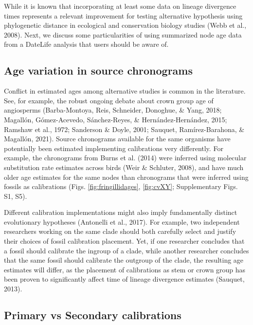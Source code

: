 \documentclass[english,man]{apa6}
\begin{document}
While it is known that incorporating at least some data on lineage divergence times represents a relevant improvement for testing alternative hypothesis using phylogenetic distance in ecological and conservation biology studies (Webb et al., 2008). Next, we discuss some particularities of using summarized node age data from a DateLife analysis that users should be aware of.

\hypertarget{age-variation-in-source-chronograms}{%
\subsection{Age variation in source chronograms}\label{age-variation-in-source-chronograms}}

Conflict in estimated ages among alternative studies is common in the literature. See, for example, the robust ongoing debate about crown group age of angiosperms (Barba-Montoya, Reis, Schneider, Donoghue, \& Yang, 2018; Magallón, Gómez-Acevedo, Sánchez-Reyes, \& Hernández-Hernández, 2015; Ramshaw et al., 1972; Sanderson \& Doyle, 2001; Sauquet, Ramírez-Barahona, \& Magallón, 2021).
Source chronograms available for the same organisms have potentially been estimated implementing calibrations very differently.
For example, the chronograms from Burns et al. (2014) were inferred using molecular substitution rate estimates across birds (Weir \& Schluter, 2008), and have much older age estimates for the same nodes than chronograms that were inferred using fossils as calibrations (Figs. \ref{fig:fringillidages}, \ref{fig:cvXY}; Supplementary Figs. S1, S5).

Different calibration implementations might also imply fundamentally distinct evolutionary hypotheses (Antonelli et al., 2017).
For example, two independent researchers working on the same clade should both carefully select and justify their choices of fossil calibration placement.
Yet, if one researcher concludes that a fossil should calibrate the ingroup of a clade, while another researcher concludes that the same fossil should calibrate the outgroup of the clade, the resulting age estimates will differ, as the placement of calibrations as stem or crown group has been proven to significantly affect time of lineage divergence estimates (Sauquet, 2013).

\hypertarget{primary-vs-secondary-calibrations}{%
\subsection{Primary vs Secondary calibrations}\label{primary-vs-secondary-calibrations}}
\end{document}

